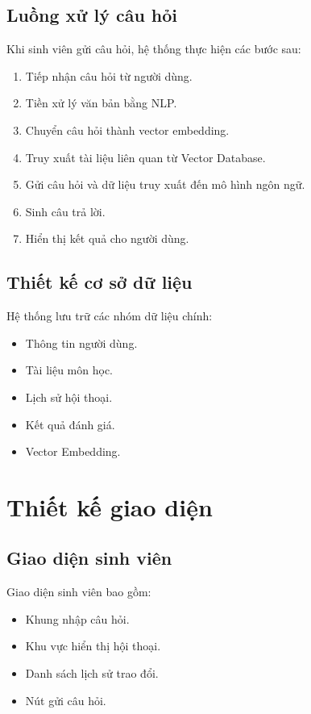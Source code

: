 \documentclass[12pt,a4paper]{report}
\begin{document}
	\subsection{Luồng xử lý câu hỏi}
	
	Khi sinh viên gửi câu hỏi, hệ thống thực hiện các bước sau:
	
	\begin{enumerate}
		\item Tiếp nhận câu hỏi từ người dùng.
		\item Tiền xử lý văn bản bằng NLP.
		\item Chuyển câu hỏi thành vector embedding.
		\item Truy xuất tài liệu liên quan từ Vector Database.
		\item Gửi câu hỏi và dữ liệu truy xuất đến mô hình ngôn ngữ.
		\item Sinh câu trả lời.
		\item Hiển thị kết quả cho người dùng.
	\end{enumerate}
	
	\subsection{Thiết kế cơ sở dữ liệu}
	
	Hệ thống lưu trữ các nhóm dữ liệu chính:
	
	\begin{itemize}
		\item Thông tin người dùng.
		\item Tài liệu môn học.
		\item Lịch sử hội thoại.
		\item Kết quả đánh giá.
		\item Vector Embedding.
	\end{itemize}
	
	\section{Thiết kế giao diện}
	
	\subsection{Giao diện sinh viên}
	
	Giao diện sinh viên bao gồm:
	
	\begin{itemize}
		\item Khung nhập câu hỏi.
		\item Khu vực hiển thị hội thoại.
		\item Danh sách lịch sử trao đổi.
		\item Nút gửi câu hỏi.
	\end{itemize}
	
\end{document}
